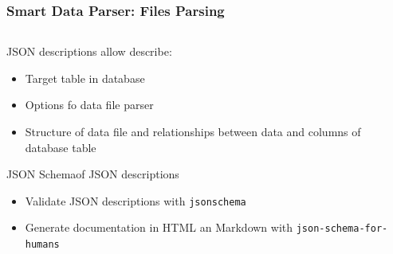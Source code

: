 \documentclass[8pt,pdf,hyperref={unicode}]{beamer}
\begin{document}
\begin{frame}
	\frametitle{Smart Data Parser: Files Parsing}
	\begin{columns}
		\begin{column}{0.5\linewidth}
			JSON descriptions allow describe:
			\begin{itemize}
				\item Target table in database
				\item Options fo data file parser
				\item Structure of data file and relationships between data and columns of database table
			\end{itemize}
			JSON Schema\footnotemark of JSON descriptions
			\begin{itemize}
				\item Validate  JSON descriptions with \texttt{jsonschema}\footnotemark
				\item Generate documentation in HTML an Markdown with \texttt{json-schema-for-humans}\footnotemark
			\end{itemize}
		\end{column}
		\begin{column}{0.5\linewidth}
			
		\end{column}
	\end{columns} 
\end{frame}
\end{document}
